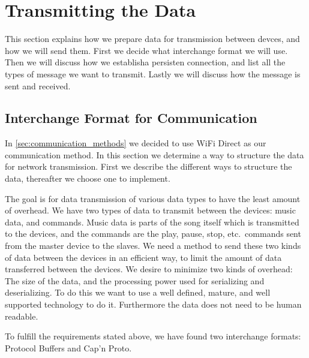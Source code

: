 \section{Transmitting the Data}\label{sec:transmitting_the_data}
This section explains how we prepare data for transmission between devces, and how we will send them.
First we decide what interchange format we will use.
Then we will discuss how we establisha persisten connection, and list all the types of message we want to transmit.
Lastly we will discuss how the message is sent and received.

\subsection{Interchange Format for Communication}\label{sec:transmit}
In \cref{sec:communication_methods} we decided to use WiFi Direct as our communication method.
In this section we determine a way to structure the data for network transmission.
First we describe the different ways to structure the data, thereafter we choose one to implement.

\bigskip
The goal is for data transmission of various data types to have the least amount of overhead.
We have two types of data to transmit between the devices: music data, and commands.
Music data is parts of the song itself which is transmitted to the devices,
and the commands are the play, pause, stop, etc.\ commands sent from the master device to the slaves.
We need a method to send these two kinds of data between the devices in an efficient way,
to limit the amount of data transferred between the devices.
We desire to minimize two kinds of overhead: The size of the data, and the processing power used for serializing and deserializing.
To do this we want to use a well defined, mature, and well supported technology to do it.
Furthermore the data does not need to be human readable.

\bigskip
To fulfill the requirements stated above, we have found two interchange formats: Protocol Buffers and Cap'n Proto.

